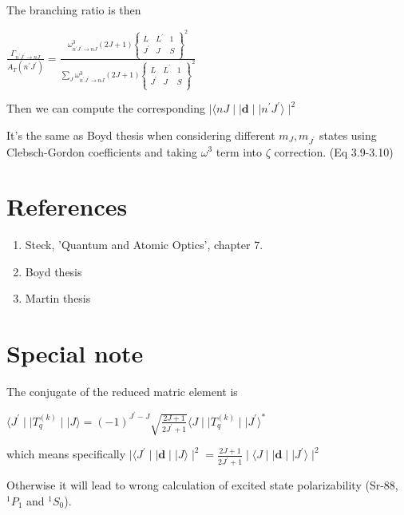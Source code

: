 \documentclass{article}
\begin{document}
The branching ratio is then

$\frac{\Gamma_{n^{'} J^{'} \rightarrow nJ}}{A_T(n^{'}J^{'})} = \frac{\omega_{n^{'} J^{'} \rightarrow nJ}^3 (2J+1)\begin{Bmatrix} L & L^{'} & 1 \\ J^{'} &  J & S \\ \end{Bmatrix}^2}{\sum_J \omega_{n^{'} J^{'} \rightarrow nJ}^3 (2J+1)\begin{Bmatrix} L & L^{'} & 1 \\ J^{'} &  J & S \\ \end{Bmatrix}^2}$

Then we can compute the corresponding
$\mid \langle nJ \mid \mid \textbf{d} \mid \mid n^{'} J^{'} \rangle \mid^2$

It's the same as Boyd thesis when considering different $m_J, m_{J^{'}}$
states using Clebsch-Gordon coefficients and taking $\omega^3$ term into
$\zeta$ correction. (Eq 3.9-3.10)

    \section{References}\label{references}

    \begin{enumerate}
\def\labelenumi{\arabic{enumi}.}
\item
  Steck, 'Quantum and Atomic Optics', chapter 7.
\item
  Boyd thesis
\item
  Martin thesis
\end{enumerate}

\section{Special note}\label{special note}

The conjugate of the reduced matric element is

$\langle J^{'} \mid \mid   T_q^{(k)} \mid \mid J \rangle = (-1)^{J^{'} - J} \sqrt{\frac{2 J + 1}{2 J^{'} + 1}} \langle J \mid \mid   T_q^{(k)} \mid \mid J^{'} \rangle ^{*}$

which means specifically $\mid \langle J^{'} \mid\mid \textbf{d} \mid \mid J \rangle \mid^2 = \frac{2 J + 1}{2 J^{'} + 1} \mid \langle J \mid\mid \textbf{d} \mid \mid J^{'} \rangle \mid^2 $

Otherwise it will lead to wrong calculation of  excited state polarizability (Sr-88, $^1P_1$ and $^1S_0$).
\end{document}
